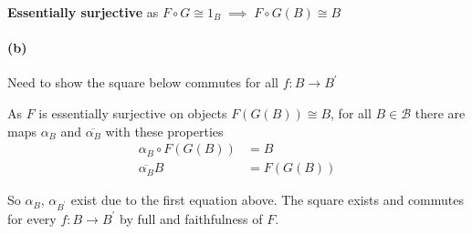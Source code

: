 \documentclass{article}
\begin{document}
\textbf{Essentially surjective} as $F \circ G \cong 1_B \; \implies \; F\circ G(B) \cong B$

\paragraph{(b)}

Need to show the square below commutes for all $f\colon B \rightarrow B^\prime$

\begin{center}
\end{center}

As $F$ is essentially surjective on objects $F(G(B)) \cong B$, for all $B \in \mathcal{B}$ there are maps $\alpha_B$ and $\overline{\alpha_B}$ with these properties
\begin{align*}
  \alpha_B \circ F(G(B)) &= B \\
  \overline{\alpha_B} B &=  F(G(B))
\end{align*}

So $\alpha_B$, $\alpha_{B^\prime}$ exist due to the first equation above. The square exists and commutes for every $f\colon B \rightarrow B^{\prime}$ by full and faithfulness of $F$.
\end{document}
